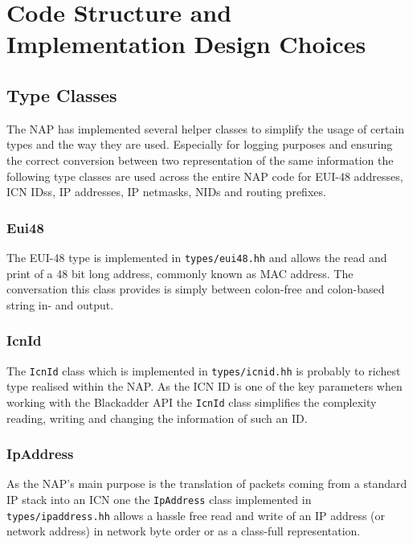 \documentclass[a4paper,11pt,titlepage]{report}
\begin{document}
\chapter{Code Structure and Implementation Design Choices}
\section{Type Classes}
The \ac{NAP} has implemented several helper classes to simplify the usage of certain types and the way they are used. Especially for logging purposes and ensuring the correct conversion between two representation of the same information the following type classes are used across the entire NAP code for EUI-48 addresses, \ac{ICN} \acp{IDs}, IP addresses, IP netmasks, \acp{NID} and routing prefixes.

\subsection{Eui48}\label{sec:Types_eui48}
The \ac{EUI-48} type is implemented in \texttt{types/eui48.hh} and allows the read and print of a 48 bit long address, commonly known as \ac{MAC} address. The conversation this class provides is simply between colon-free and colon-based string in- and output.

\subsection{IcnId}\label{sec:Types_IcnId}
The \texttt{IcnId} class which is implemented in \texttt{types/icnid.hh} is probably to richest type realised within the \ac{NAP}. As the \ac{ICN} \ac{ID} is one of the key parameters when working with the Blackadder API the \texttt{IcnId} class simplifies the complexity reading, writing and changing the information of such an ID.

\subsection{IpAddress}\label{sec:Types_IpAddress}
As the \ac{NAP}'s main purpose is the translation of packets coming from a standard IP stack into an \ac{ICN} one the \texttt{IpAddress} class implemented in  \texttt{types/ipaddress.hh} allows a hassle free read and write of an IP address (or network address) in network byte order or as a class-full representation.
\end{document}
